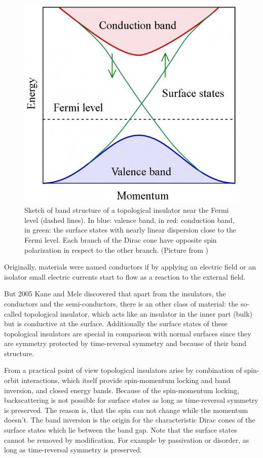 	\begin{figure}[tbp]
		\centering
		\includegraphics[width=0.4\linewidth]{andere_bilder/band_structure_top_insulator.jpg}
		\caption{%
			Sketch of band structure of a topological insulator near the Fermi level (dashed lines). In blue: valence band, in red: conduction band, in green: the surface states with nearly linear dispersion close to the Fermi level. Each branch of the Dirac cone have opposite spin polarization in respect to the other branch. 
			(Picture from \cite{wiki_top_ins})} \label{band_structure_top_insulator}
	\end{figure}
	Originally, materials were named conductors if by applying an electric field or an isolator small electric currents start to flow as a reaction to the external field. 
	
	But 2005 Kane and Mele \cite{Kane_Mele1} discovered that apart from the insulators, the conductors and the semi-conductors, there is an other class of material: the so-called topological insulator, which acts like an insulator in the inner part (bulk) but is conductive at the surface. 
	Additionally the surface states of these topological insulators are special in comparison with normal surfaces since they are symmetry protected by time-reversal symmetry and because of their band structure. 
	
	From a practical point of view topological insulators arise by combination of spin-orbit interactions, which itself provide spin-momentum locking and band inversion, and closed energy bands. Because of the spin-momentum locking, backscattering is not possible for surface states as long as time-reversal symmetry is preserved. The reason is, that the spin can not change while the momentum doesn't. 
	The band inversion is the origin for the characteristic Dirac cones of the surface states which lie between the band gap.
	Note that the surface states cannot be removed by modification. For example by passivation or disorder, as long as time-reversal symmetry is preserved. 
	
